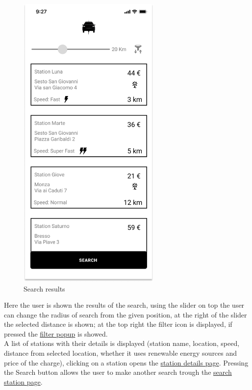\begin{figure}[H]
    \centering
    \includegraphics[keepaspectratio, height=15cm]{Mockup/UserAppInterface/Results.png}
    \caption{Search results}
    \label{fig:Results}
\end{figure}
Here the user is shown the results of the search, using the slider on top the user can change the radius of search from the given position, at the right of the slider the selected distance is shown; at the top right the filter icon is displayed, if pressed the \hyperref[fig:Filters]{filter popup} is showed.\\
A list of stations with their details is displayed (station name, location, speed, distance from selected location, whether it uses renewable energy sources and price of the charge), clicking on a station opens the \hyperref[fig:StationDetails]{station details page}. Pressing the Search button allows the user to make another search trough the \hyperref[fig:Search]{search station page}.
